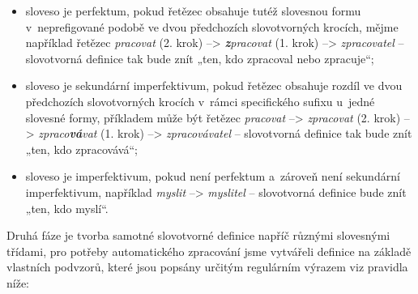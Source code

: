 \begin{itemize}
\tightlist
\item
  sloveso je perfektum, pokud řetězec obsahuje tutéž slovesnou formu
v~neprefigované podobě ve dvou předchozích slovotvorných krocích, mějme
  například řetězec \emph{pracovat} (2. krok) --\textgreater{}
  \emph{\textbf{z}pracovat} (1. krok) --\textgreater{}
  \emph{zpracovatel} -- slovotvorná definice tak bude znít „ten, kdo
  zpracoval nebo zpracuje``;
\item
  sloveso je sekundární imperfektivum, pokud řetězec obsahuje rozdíl ve
  dvou předchozích slovotvorných krocích v~rámci specifického sufixu
u~jedné slovesné formy, příkladem může být řetězec \emph{pracovat}
  --\textgreater{} \emph{zpracovat} (2. krok) --\textgreater{}
  \emph{zpraco\textbf{vá}vat} (1. krok) --\textgreater{}
  \emph{zpracovávatel} -- slovotvorná definice tak bude znít „ten, kdo
  zpracovává``;
\item
  sloveso je imperfektivum, pokud není perfektum a~zároveň není
  sekundární imperfektivum, například \emph{myslit} --\textgreater{}
  \emph{myslitel} -- slovotvorná definice bude znít „ten, kdo myslí``.
\end{itemize}

Druhá fáze je tvorba samotné slovotvorné definice napříč různými
slovesnými třídami, pro potřeby automatického zpracování jsme vytvářeli
definice na základě vlastních podvzorů, které jsou popsány určitým
regulárním výrazem viz pravidla níže:

